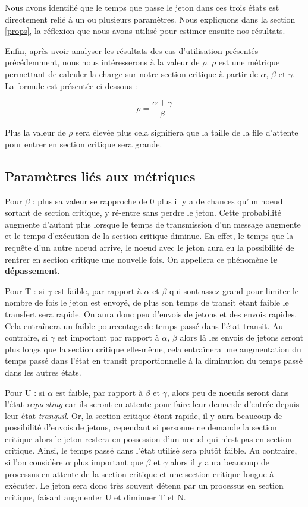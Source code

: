 \documentclass[12pt,a4paper]{article}
\begin{document}
Nous avons identifié que le temps que passe le jeton dans ces trois états est directement relié à un ou plusieurs paramètres. Nous expliquons dans la section \ref{props}, la réflexion que nous avons utilisé pour estimer ensuite nos résultats. 

Enfin, après avoir analyser les résultats des cas d'utilisation présentés précédemment, nous nous intéresserons à la valeur de $\rho$. $\rho$ est une métrique permettant de calculer la charge sur notre section critique à partir de $\alpha$, $\beta$ et $\gamma$. La formule est présentée ci-dessous :

\[ \rho = \frac{\alpha + \gamma}{\beta} \]

Plus la valeur de $\rho$ sera élevée plus cela signifiera que la taille de la file d'attente pour entrer en section critique sera grande.

\subsection{Paramètres liés aux métriques \label{props}}
Pour $\beta$ : plus sa valeur se rapproche de $0$ plus il y a de chances qu'un noeud sortant de section critique, y ré-entre sans perdre le jeton. Cette probabilité augmente d'autant plus lorsque le temps de transmission d'un message augmente et le temps d'exécution de la section critique diminue. En effet, le temps que la requête d'un autre noeud arrive, le noeud avec le jeton aura eu la possibilité de rentrer en section critique une nouvelle fois. On appellera ce phénomène \textbf{le dépassement}.

Pour T : si $\gamma$ est faible, par rapport à $\alpha$ et $\beta$ qui sont assez grand pour limiter le nombre de fois le jeton est envoyé, de plus son temps de transit étant faible le transfert sera rapide. On aura donc peu d'envois de jetons et des envois rapides. Cela entraînera un faible pourcentage de temps passé dans l'état transit. Au contraire, si $\gamma$ est important par rapport à $\alpha$, $\beta$ alors là les envois de jetons seront plus longs que la section critique elle-même, cela entraînera une augmentation du temps passé dans l'état en transit proportionnelle à la diminution du temps passé dans les autres états.

Pour U : si $\alpha$ est faible, par rapport à $\beta$ et $\gamma$, alors peu de noeuds seront dans l'état \textit{requesting} car ils seront en attente pour faire leur demande d'entrée depuis leur état \textit{tranquil}. Or, la section critique étant rapide, il y aura beaucoup de possibilité d'envois de jetons, cependant si personne ne demande la section critique alors le jeton restera en possession d'un noeud qui n'est pas en section critique. Ainsi, le temps passé dans l'état utilisé sera plutôt faible. Au contraire, si l'on considère $\alpha$ plus important que $\beta$ et $\gamma$ alors il y aura beaucoup de processus en attente de la section critique et une section critique longue à exécuter. Le jeton sera donc très souvent détenu par un processus en section critique, faisant augmenter U et diminuer T et N.
\end{document}
